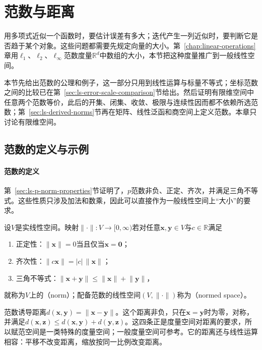 
\section{范数与距离}
\label{sec:ls-normed-spaces}

用多项式近似一个函数时，要估计误差有多大；迭代产生一列近似时，要判断它是否趋于某个对象。这些问题都需要先规定向量的大小。第~\ref{chap:linear-operations}章用$\ell_1$、$\ell_2$、$\ell_\infty$范数度量$\mathbb R^d$中数组的大小，本节把这种度量推广到一般线性空间。

本节先给出范数的公理和例子，这一部分只用到线性运算与标量不等式；坐标范数之间的比较已在第~\ref{sec:ls-error-scale-comparison}节给出。然后证明有限维空间中任意两个范数等价，此后的开集、闭集、收敛、极限与连续性因而都不依赖所选范数；第~\ref{sec:ls-derived-norms}节再在矩阵、线性泛函和商空间上定义范数。本章只讨论有限维空间。

\subsection{范数的定义与示例}
\label{sec:ls-normed-space-definition}

\paragraph{范数的定义}
第~\ref{sec:ls-p-norm-properties}节证明了，$p$范数非负、正定、齐次，并满足三角不等式。这些性质只涉及加法和数乘，因此可以直接作为一般线性空间上“大小”的要求。
\begin{definition}[赋范空间]
\label{def:ls-normed-space}
\label{def:functional-normed-space}
设$V$是实线性空间。映射$\lVert\cdot\rVert:V\to[0,\infty)$若对任意$\bm x,\bm y\in V$与$c\in\mathbb R$满足
\begin{enumerate}
 \item 正定性：$\lVert\bm x\rVert=0$当且仅当$\bm x=\bm0$；
 \item 齐次性：$\lVert c\bm x\rVert=|c|\,\lVert\bm x\rVert$；
 \item 三角不等式：$\lVert\bm x+\bm y\rVert\leq\lVert\bm x\rVert+\lVert\bm y\rVert$，
\end{enumerate}
就称为$V$上的（norm）；配备范数的线性空间$(V,\lVert\cdot\rVert)$称为（normed space）。
\end{definition}
范数诱导距离$d(\bm x,\bm y)=\lVert\bm x-\bm y\rVert$。这个距离非负，只在$\bm x=\bm y$时为零，对称，并满足$d(\bm x,\bm z)\leq d(\bm x,\bm y)+d(\bm y,\bm z)$。这四条正是度量空间对距离的要求，所以赋范空间是一类特殊的度量空间；一般度量空间可参考。它的距离还与线性运算相容：平移不改变距离，缩放按同一比例改变距离。


